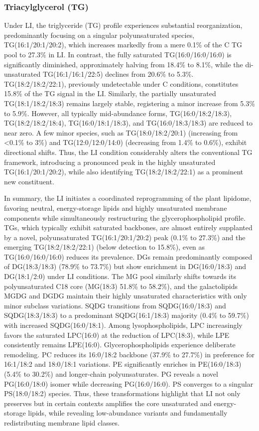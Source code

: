 \documentclass[10pt,letterpaper]{article}
\begin{document}
\begin{itemize}
\subsubsection*{Triacylglycerol (TG)} 
Under LI, the triglyceride (TG) profile experiences substantial reorganization, predominantly focusing on a singular polyunsaturated species, TG(16:1/20:1/20:2), which increases markedly from a mere 0.1\% of the C TG pool to 27.3\% in LI. In contrast, the fully saturated TG(16:0/16:0/16:0) is significantly diminished, approximately halving from 18.4\% to 8.1\%, while the di-unsaturated TG(16:1/16:1/22:5) declines from 20.6\% to 5.3\%. TG(18:2/18:2/22:1), previously undetectable under C conditions, constitutes 15.8\% of the TG signal in the LI. Similarly, the partially unsaturated TG(18:1/18:2/18:3) remains largely stable, registering a minor increase from 5.3\% to 5.9\%. However, all typically mid-abundance forms, TG(16:0/18:2/18:3), TG(18:2/18:2/18:4), TG(16:0/18:1/18:3), and TG(16:0/18:3/18:3) are reduced to near zero. A few minor species, such as TG(18:0/18:2/20:1) (increasing from \textless0.1\% to 3\%) and TG(12:0/12:0/14:0) (decreasing from 1.4\% to 0.6\%), exhibit directional shifts. Thus, the LI condition considerably alters the conventional TG framework, introducing a pronounced peak in the highly unsaturated TG(16:1/20:1/20:2), while also identifying TG(18:2/18:2/22:1) as a prominent new constituent.

\bigskip
In summary, the LI initiates a coordinated reprogramming of the plant lipidome, favoring neutral, energy-storage lipids and highly unsaturated membrane components while simultaneously restructuring the glycerophospholipid profile. TGs, which typically exhibit saturated backbones, are almost entirely supplanted by a novel, polyunsaturated TG(16:1/20:1/20:2) peak (0.1\% to 27.3\%) and the emerging TG(18:2/18:2/22:1) (below detection to 15.8\%), even as TG(16:0/16:0/16:0) reduces its prevalence. DGs remain predominantly composed of DG(18:3/18:3) (78.9\% to 73.7\%) but show enrichment in DG(16:0/18:3) and DG(18:1/2:0) under LI conditions. The MG pool similarly shifts towards its polyunsaturated C18 core (MG(18:3) 51.8\% to 58.2\%), and the galactolipids MGDG and DGDG maintain their highly unsaturated characteristics with only minor subclass variations. SQDG transitions from SQDG(16:0/18:3) and SQDG(18:3/18:3) to a predominant SQDG(16:1/18:3) majority (0.4\% to 59.7\%) with increased SQDG(16:0/18:1). Among lysophospholipids, LPC increasingly favors the saturated LPC(16:0) at the reduction of LPC(18:3), while LPE consistently remains LPE(16:0). Glycerophospholipids experience deliberate remodeling. PC reduces its 16:0/18:2 backbone (37.9\% to 27.7\%) in preference for 16:1/18:2 and 18:0/18:1 variations. PE significantly enriches in PE(16:0/18:3) (5.4\% to 30.2\%) and longer-chain polyunsaturates. PG reveals a novel PG(16:0/18:0) isomer while decreasing PG(16:0/16:0). PS converges to a singular PS(18:0/18:2) species. Thus, these transformations highlight that LI not only preserves but in certain contexts amplifies the core unsaturated and energy-storage lipids, while revealing low-abundance variants and fundamentally redistributing membrane lipid classes.



\end{itemize}
\end{document}
